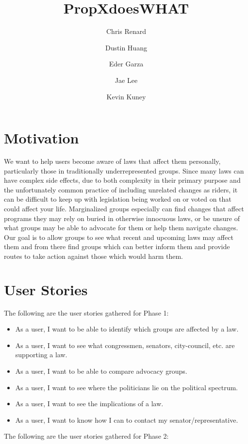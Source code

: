 \documentclass[12pt]{article}
\title{PropXdoesWHAT}
\author{Chris Renard \and Dustin Huang \and Eder Garza \and Jae Lee \and Kevin Kuney}
\date{} %
\begin{document}
\maketitle

\section{Motivation}

We want to help users become aware of laws that affect them personally, particularly those in traditionally underrepresented groups. 
Since many laws can have complex side effects, due to both complexity in their primary purpose and the unfortunately common practice of including unrelated changes as riders, it can be difficult to keep up with legislation being worked on or voted on that could affect your life.
Marginalized groups especially can find changes that affect programs they may rely on buried in otherwise innocuous laws, or be unsure of what groups may be able to advocate for them or help them navigate changes.
Our goal is to allow groups to see what recent and upcoming laws may affect them and from there find groups which can better inform them and provide routes to take action against those which would harm them.


\section{User Stories}

The following are the user stories gathered for Phase 1: \\

\begin{itemize}
	\item As a user, I want to be able to identify which groups are affected by a law.
	\item As a user, I want to see what congressmen, senators, city-council, etc. are supporting a law.
	\item As a user, I want to be able to compare advocacy groups.
	\item As a user, I want to see where the politicians lie on the political spectrum.
	\item As a user, I want to see the implications of a law.
	\item As a user, I want to know how I can to contact my senator/representative.
	
\end{itemize}


The following are the user stories gathered for Phase 2: \\
	
\end{document}

